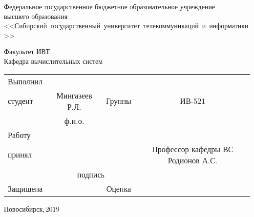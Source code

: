 \begin{titlepage}
    \begin{center}
        Федеральное государственное бюджетное образовательное учреждение \\
        высшего образования \\
        \hbox{<<Сибирский государственный университет телекоммуникаций и
            информатики>>}
    \end{center}

    \vspace{1cm}
    \begin{flushright}
        Факультет ИВТ \\
        \vspace{1cm}
        Кафедра вычислительных систем \\

    \end{flushright}
    \vfill
    \begin{center}
        \large

        \normalsize
    \end{center}

    \vfill
    \begin{table}[h!]
        \centering
        \begin{tabular}{lcccc}
            Выполнил                                                 \\ студент & \multicolumn{2}{c}{Мингазеев Р.Л.} & Группы & ИВ-521 \\ \cline{2-3} \cline{5-5}
                     & \multicolumn{2}{c}{\small ф.и.о.}             \\
            Работу                                                   \\ принял  & \multicolumn{3}{c}{}  &Профессор кафедры ВС Родионов А.С. \\ \cline{2-4}
                     & \multicolumn{3}{c}{\small подпись} &          \\
            Защищена & \multicolumn{2}{c}{}               & Оценка & \\ \cline{2-3} \cline{5-5}
        \end{tabular}
    \end{table}

    \vfill
    \begin{center}
        Новосибирск,\,2019
    \end{center}

\end{titlepage}
\setcounter{page}{2}

\tableofcontents
\thispagestyle{empty}
\newpage

